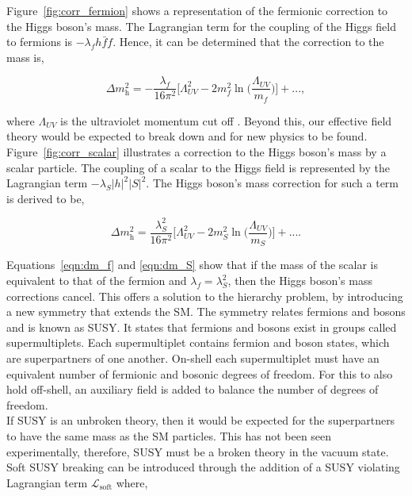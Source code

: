 Figure~\ref{fig:corr_fermion} shows a representation of the fermionic correction to the Higgs boson's mass. 
The Lagrangian term for the coupling of the Higgs field to fermions is $-\lambda_f h \bar{f} f$. 
Hence, it can be determined that the correction to the mass is,

\begin{equation}
\Delta m_{\text{h}}^{2} =  -\frac{\lambda_f}{16\pi^2}\Big[\Lambda_{UV}^{2} -2m_{f}^{2} \ln\Big(\frac{\Lambda_{UV}}{m_f}\Big) \Big] + ... ,
\label{eqn:dm_f}
\end{equation}

where \(\Lambda_{UV}\) is the ultraviolet momentum cut off \cite{SUSY_Primer}.
Beyond this, our effective field theory would be expected to break down and for new physics to be found. \\

Figure~\ref{fig:corr_scalar} illustrates a correction to the Higgs boson's mass by a scalar particle. 
The coupling of a scalar to the Higgs field is represented by the Lagrangian term $-\lambda_S |h|^2 |S|^2$. 
The Higgs boson's mass correction for such a term is derived to be,

\begin{equation}
    \Delta m_{\text{h}}^{2} =  \frac{\lambda_{S}^{2}}{16\pi^2}\Big[\Lambda_{UV}^{2} -2m_{S}^{2} \ln\Big(\frac{\Lambda_{UV}}{m_S}\Big) \Big] + ... .
    \label{eqn:dm_S}
\end{equation}

Equations~\ref{eqn:dm_f} and \ref{eqn:dm_S} show that if the mass of the scalar is equivalent to that of the fermion and $\lambda_f = \lambda_{S}^{2}$, then the Higgs boson's mass corrections cancel. 
This offers a solution to the hierarchy problem, by introducing a new symmetry that extends the \ac{SM}. 
The symmetry relates fermions and bosons and is known as \ac{SUSY}. 
It states that fermions and bosons exist in groups called supermultiplets. 
Each supermultiplet contains fermion and boson states, which are superpartners of one another. 
On-shell each supermultiplet must have an equivalent number of fermionic and bosonic degrees of freedom. 
For this to also hold off-shell, an auxiliary field is added to balance the number of degrees of freedom. \\

If \ac{SUSY} is an unbroken theory, then it would be expected for the superpartners to have the same mass as the \ac{SM} particles. 
This has not been seen experimentally, therefore, \ac{SUSY} must be a broken theory in the vacuum state. 
Soft \ac{SUSY} breaking can be introduced through the addition of a \ac{SUSY} violating Lagrangian term $\mathcal{L}_{\text{soft}}$ where,

